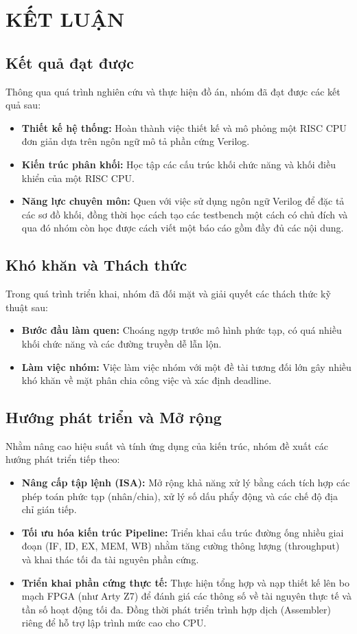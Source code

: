 \section{ KẾT LUẬN}


\subsection{Kết quả đạt được}
Thông qua quá trình nghiên cứu và thực hiện đồ án, nhóm đã đạt được các kết quả sau:
\begin{itemize}
    \item \textbf{Thiết kế hệ thống:} Hoàn thành việc thiết kế và mô phỏng một RISC CPU đơn giản dựa trên ngôn ngữ mô tả phần cứng Verilog. 
    \item \textbf{Kiến trúc phân khối:} Học tập các cấu trúc khối chức năng và khối điều khiển của một RISC CPU.
    \item \textbf{Năng lực chuyên môn:} Quen với việc sử dụng ngôn ngữ Verilog để đặc tả các sơ đồ khối, đồng thời học cách tạo các testbench một cách có chủ đích và qua đó
    nhóm còn học được cách viết một báo cáo gồm đầy đủ các nội dung.
\end{itemize}

\subsection{Khó khăn và Thách thức}
Trong quá trình triển khai, nhóm đã đối mặt và giải quyết các thách thức kỹ thuật sau:
\begin{itemize}
    \item \textbf{Bước đầu làm quen:} Choáng ngợp trước mô hình phức tạp, có quá nhiều khối chức năng và các đường truyền dễ lẫn lộn.
    \item \textbf{Làm việc nhóm: } Việc làm việc nhóm với một đề tài tương đối lớn gây nhiều khó khăn về mặt phân chia công việc và xác định deadline.
\end{itemize}

\subsection{Hướng phát triển và Mở rộng}
Nhằm nâng cao hiệu suất và tính ứng dụng của kiến trúc, nhóm đề xuất các hướng phát triển tiếp theo:
\begin{itemize}
    \item \textbf{Nâng cấp tập lệnh (ISA):} Mở rộng khả năng xử lý bằng cách tích hợp các phép toán phức tạp (nhân/chia), xử lý số dấu phẩy động và các chế độ địa chỉ gián tiếp.
    \item \textbf{Tối ưu hóa kiến trúc Pipeline:} Triển khai cấu trúc đường ống nhiều giai đoạn (IF, ID, EX, MEM, WB) nhằm tăng cường thông lượng (throughput) và khai thác tối đa tài nguyên phần cứng.
    \item \textbf{Triển khai phần cứng thực tế:} Thực hiện tổng hợp và nạp thiết kế lên bo mạch FPGA (như Arty Z7) để đánh giá các thông số về tài nguyên thực tế và tần số hoạt động tối đa. Đồng thời phát triển trình hợp dịch (Assembler) riêng để hỗ trợ lập trình mức cao cho CPU.
\end{itemize}

